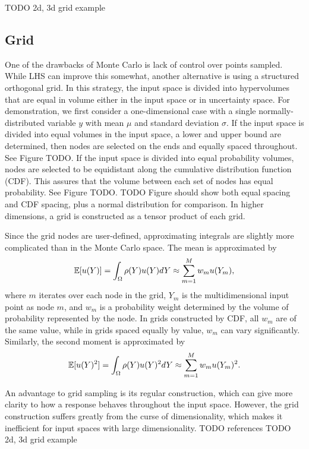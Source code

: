 TODO 2d, 3d grid example

\subsection{Grid}
One of the drawbacks of Monte Carlo is lack of control over points sampled.  While LHS can improve this
somewhat, another alternative is using a structured orthogonal grid.  In this strategy, the input space is
divided into hypervolumes that are equal in volume either in the input space or in uncertainty space.  For
demonstration, we first consider a one-dimensional case with a single normally-distributed variable $y$ with mean
$\mu$ and standard deviation $\sigma$.  If the input space is divided into equal volumes in the input space, a lower and upper bound are determined,
then nodes are selected on the ends and equally spaced throughout.  See Figure TODO.  If the input space is
divided into equal probability volumes, nodes are selected to be equidistant along the cumulative distribution
function (CDF).  This assures that the volume between each set of nodes has equal probability.  See Figure TODO.
TODO Figure should show both equal spacing and CDF spacing, plus a normal distribution for comparison.
In higher dimensions, a grid is constructed as a tensor product of each grid.

Since the grid nodes are user-defined, approximating integrals are slightly more complicated than in the Monte
Carlo space.  The mean is approximated by
\begin{equation}
  \mathbb{E}[ u(Y)] = \int_\Omega \rho(Y) u(Y) dY \approx \sum_{m=1}^M w_m u(Y_m),
\end{equation}
where $m$ iterates over each node in the grid, $Y_m$ is the multidimensional input point as node $m$, and
$w_m$ is a probability weight determined by the volume of probability represented by the node.  In grids
constructed by CDF, all $w_m$ are of the same value, while in grids spaced equally by value, $w_m$ can vary
significantly.  Similarly, the second moment is approximated by
\begin{equation}
  \mathbb{E}[ u(Y)^2] = \int_\Omega \rho(Y) u(Y)^2 dY \approx \sum_{m=1}^M w_m u(Y_m)^2.
\end{equation}

An advantage to grid sampling is its regular construction, which can give more clarity to how a response
behaves throughout the input space.  However, the grid construction suffers greatly from the curse of
dimensionality, which makes it inefficient for input spaces with large dimensionality. TODO references
TODO 2d, 3d grid example


